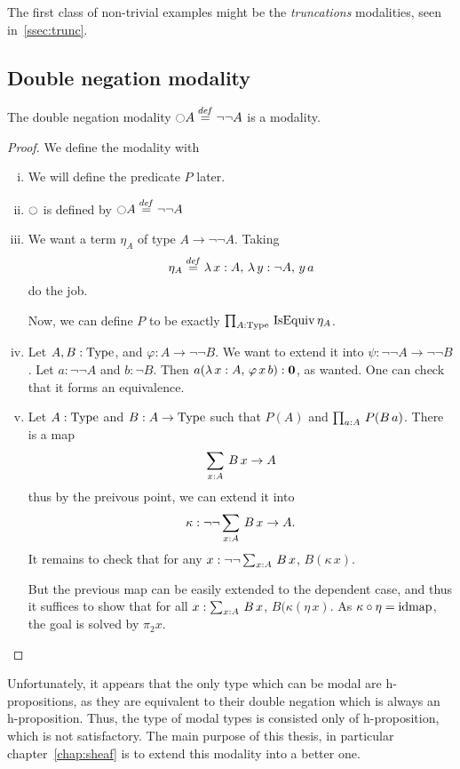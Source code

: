 The first class of non-trivial examples might be the {\em truncations}
modalities, seen in~\ref{ssec:trunc}.

\subsection{Double negation modality}
\label{ssec:notnot}

\begin{prop}
  The double negation modality $\ocircle A \overset{de\hspace{-0.2ex}f}{=} \lnot\lnot A$ is a
  modality.  
\end{prop}
\begin{proof}
  We define the modality with
  \begin{enumerate}[(i)]
  \item We will define the predicate $P$ later.
  \item $\ocircle$ is defined by $\ocircle A \overset{de\hspace{-0.2ex}f}{=} \lnot\lnot A$
  \item We want a term $\eta_A$ of type $A \to \lnot \lnot A$.
    Taking 
    \[ \eta_A\overset{de\hspace{-0.2ex}f}{=} \lambda \, x:A,\,\lambda\, y:\lnot A,\, y\, a\] 
    do the job.
    
    Now, we can define $P$ to be exactly $\prod_{A:\operatorname{Type}}\, \operatorname{IsEquiv}
      \eta_A$.
  \item Let $A,B:\operatorname{Type}$, and $\varphi : A \to \lnot\lnot B$. We
    want to extend it into $\psi : \lnot\lnot A \to \lnot\lnot B$. Let
    $a:\lnot\lnot A$ and $b:\lnot B$.
    Then $a(\lambda\, x:A,\, \varphi\, x \, b) : \mathbf{0}$, as
    wanted. One can check that it forms an equivalence.
  \item Let $A:\operatorname{Type}$ and $B:A\to\operatorname{Type}$ such that $P(A)$ and $\prod_{a:A}\, P(B\, a)$. There is a map
    \[\sum_{x:A}\, B\, x \to A \]
    thus by the preivous point, we can extend it into 
    \[\kappa:\lnot\lnot\sum_{x:A}\, B\, x \to A.\]
    It remains to check that for any $x:\lnot\lnot\sum_{x:A}\, B\, x$,
    $B(\kappa\, x)$.

    But the previous map can be easily extended to the dependent case,
    and thus it suffices to show that for all $x:\sum_{x:A}\, B\, x$,
    $B(\kappa(\eta\, x)$. As $\kappa \circ \eta = \operatorname{\mathrm{idmap}}$, the goal is
    solved by $\pi_2 x$.
  \end{enumerate}
\end{proof}

Unfortunately, it appears that the only type which can be modal are
h-propositions, as they are equivalent to their double negation which
is always an h-proposition. Thus, the type of modal types is consisted
only of h-proposition, which is not satisfactory. The main purpose of this
thesis, in particular chapter~\ref{chap:sheaf} is to extend this
modality into a better one.

